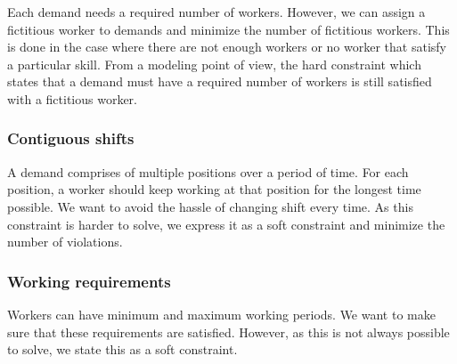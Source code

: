 \documentclass[../thesis.tex]{subfiles}
\begin{document}
Each demand needs a required number of workers. However, we can assign a fictitious worker to demands 
and minimize the number of fictitious workers. This is done in the case where there are not enough workers
or no worker that satisfy a particular skill. From a modeling point of view, the hard constraint which states that 
a demand must have a required number of workers is still satisfied with a fictitious worker.

\subsubsection{Contiguous shifts}

A demand comprises of multiple positions over a period of time. 
For each position, a worker should keep working at that position for the longest time possible. 
We want to avoid the hassle of changing shift every time. 
As this constraint is harder to solve, we express it as a soft constraint and minimize the number of 
violations.

\subsubsection{Working requirements}

Workers can have minimum and maximum working periods. We want to make sure 
that these requirements are satisfied. However, as this is not always possible to solve, we 
state this as a soft constraint.
\end{document}
